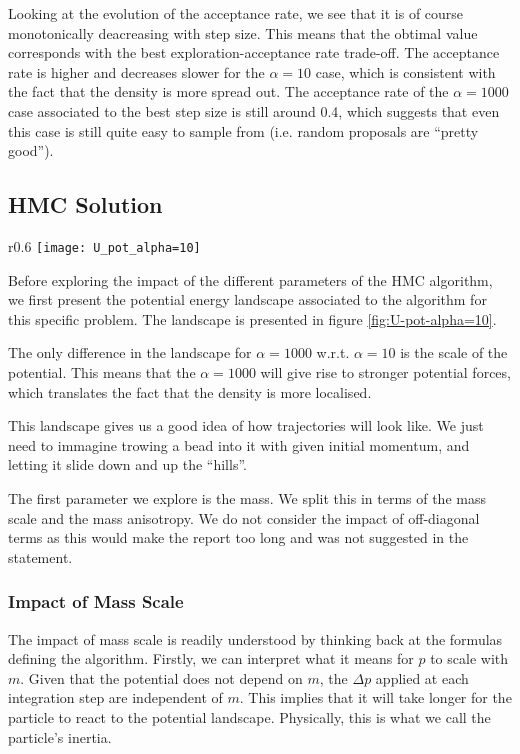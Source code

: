 \documentclass[a4paper, 12pt,oneside]{article}
\begin{document}
			Looking at the evolution of the acceptance rate, we see that it is of course monotonically deacreasing with step size. This means that the obtimal value corresponds with the best exploration-acceptance rate trade-off. The acceptance rate is higher and decreases slower for the $\alpha=10$ case, which is consistent with the fact that the density is more spread out. The acceptance rate of the $\alpha=1000$ case associated to the best step size is still around 0.4, which suggests that even this case is still quite easy to sample from (i.e. random proposals are ``pretty good''). 
		\subsection{HMC Solution}
			\begin{wrapfigure}[16]{r}{0.6\textwidth}
				\centering
					\vspace{-4em}
					\texttt{[image: U\_pot\_alpha=10]}
					\caption{Potential energy landscape associated to HMC algorithm for $\alpha=10$. Version for $\alpha=1000$ is identical, except the vertical scale is multiplied by a factor 100.}
					\label{fig:U-pot-alpha=10}
			\end{wrapfigure}
			Before exploring the impact of the different parameters of the HMC algorithm, we first present the potential energy landscape associated to the algorithm for this specific problem. The landscape is presented in figure \ref{fig:U-pot-alpha=10}. 

			The only difference in the landscape for $\alpha=1000$ w.r.t. $\alpha=10$ is the scale of the potential. This means that the $\alpha=1000$ will give rise to stronger potential forces, which translates the fact that the density is more localised. 

			This landscape gives us a good idea of how trajectories will look like. We just need to immagine trowing a bead into it with given initial momentum, and letting it slide down and up the ``hills''. 

			The first parameter we explore is the mass. We split this in terms of the mass scale and the mass anisotropy. We do not consider the impact of off-diagonal terms as this would make the report too long and was not suggested in the statement.
			\subsubsection{Impact of Mass Scale}
			The impact of mass scale is readily understood by thinking back at the formulas defining the algorithm.			
			Firstly, we can interpret what it means for $p$ to scale with $m$. Given that the potential does not depend on $m$, the $\Delta p$ applied at each integration step are independent of $m$. This implies that it will take longer for the particle to react to the potential landscape. Physically, this is what we call the particle's inertia.
\end{document}
